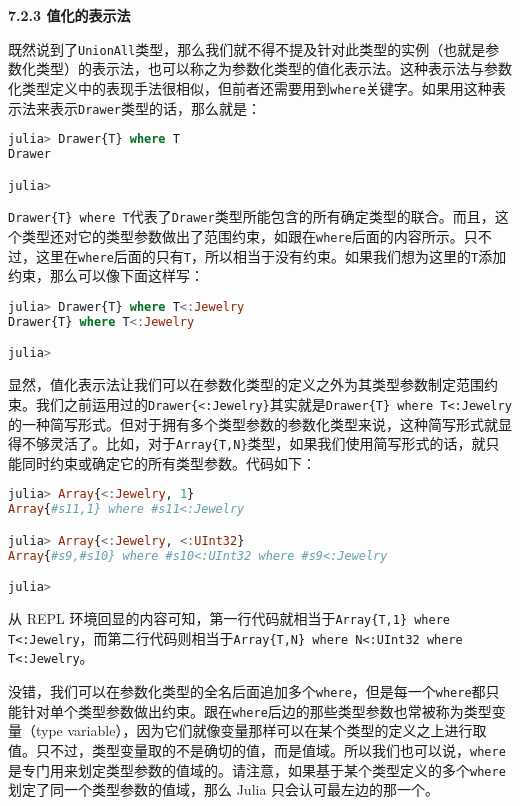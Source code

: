 \textbf{7.2.3 值化的表示法}

既然说到了\verb`UnionAll`类型，那么我们就不得不提及针对此类型的实例（也就是参数化类型）的表示法，也可以称之为参数化类型的值化表示法。这种表示法与参数化类型定义中的表现手法很相似，但前者还需要用到\verb`where`关键字。如果用这种表示法来表示\verb`Drawer`类型的话，那么就是：
\begin{lstlisting}[language=julia]
julia> Drawer{T} where T
Drawer

julia> 
\end{lstlisting}

\verb`Drawer{T} where T`代表了\verb`Drawer`类型所能包含的所有确定类型的联合。而且，这个类型还对它的类型参数做出了范围约束，如跟在\verb`where`后面的内容所示。只不过，这里在\verb`where`后面的只有\verb`T`，所以相当于没有约束。如果我们想为这里的\verb`T`添加约束，那么可以像下面这样写：
\begin{lstlisting}[language=julia]
julia> Drawer{T} where T<:Jewelry
Drawer{T} where T<:Jewelry

julia> 
\end{lstlisting}

显然，值化表示法让我们可以在参数化类型的定义之外为其类型参数制定范围约束。我们之前运用过的\verb`Drawer{<:Jewelry}`其实就是\verb`Drawer{T} where T<:Jewelry`的一种简写形式。但对于拥有多个类型参数的参数化类型来说，这种简写形式就显得不够灵活了。比如，对于\verb`Array{T,N}`类型，如果我们使用简写形式的话，就只能同时约束或确定它的所有类型参数。代码如下：
\begin{lstlisting}[language=julia]
julia> Array{<:Jewelry, 1}
Array{#s11,1} where #s11<:Jewelry

julia> Array{<:Jewelry, <:UInt32}
Array{#s9,#s10} where #s10<:UInt32 where #s9<:Jewelry

julia> 
\end{lstlisting}

从 REPL 环境回显的内容可知，第一行代码就相当于\verb`Array{T,1} where T<:Jewelry`，而第二行代码则相当于\verb`Array{T,N} where N<:UInt32 where T<:Jewelry`。

没错，我们可以在参数化类型的全名后面追加多个\verb`where`，但是每一个\verb`where`都只能针对单个类型参数做出约束。跟在\verb`where`后边的那些类型参数也常被称为类型变量（type variable），因为它们就像变量那样可以在某个类型的定义之上进行取值。只不过，类型变量取的不是确切的值，而是值域。所以我们也可以说，\verb`where`是专门用来划定类型参数的值域的。请注意，如果基于某个类型定义的多个\verb`where`划定了同一个类型参数的值域，那么 Julia 只会认可最左边的那一个。

